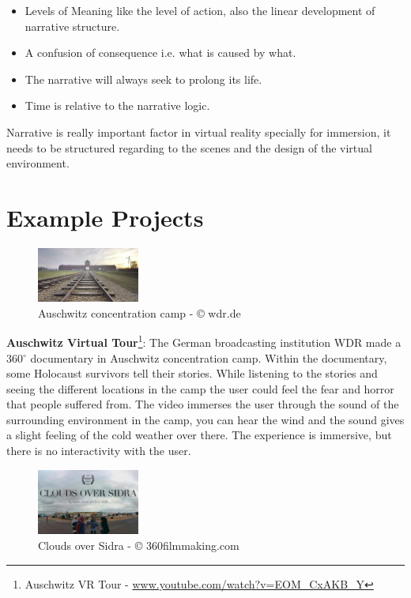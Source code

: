 \begin{itemize}
\item Levels of Meaning like the level of action, also the linear development of narrative structure.
\item A confusion of consequence i.e. what is caused by what.
\item The narrative will always seek to prolong its life. 
\item Time is relative to the narrative logic. 
\end{itemize}
Narrative is really important factor in virtual reality specially for immersion, it needs to be structured regarding to the scenes and the design of the virtual environment.  

\section{Example Projects}

\begin{figure}
    \centering
    \includegraphics[width=0.30\textwidth]{images/Auschwitz2.png}
    \caption{Auschwitz concentration camp - © wdr.de}
    \label{fig:awsch}
\end{figure}
\textbf{Auschwitz Virtual Tour}\footnote{Auschwitz VR Tour - \url{www.youtube.com/watch?v=EOM_CxAKB_Y}}: The German broadcasting institution WDR made a 360$^{\circ}$ documentary in Auschwitz concentration camp. Within the documentary, some Holocaust survivors tell their stories. While listening to the stories and seeing the different locations in the camp the user could feel the fear and horror that people suffered from. The video immerses the user through the sound of the surrounding environment in the camp, you can hear the wind and the sound gives a slight feeling of the cold weather over there. The experience is immersive, but there is no interactivity with the user.

\begin{figure}
    \centering
    \includegraphics[width=0.30\textwidth]{images/clouds.png}
    \caption{Clouds over Sidra - © 360filmmaking.com}
    \label{fig:sidra}
\end{figure}

